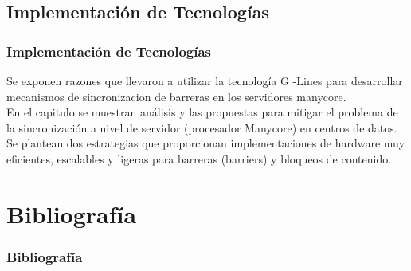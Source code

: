 \documentclass[11pt]{beamer}					%
\begin{document}
		\subsection{Implementación de Tecnologías}	
		 \begin{frame}[fragile]	
		 \frametitle{Implementación de Tecnologías}
		Se exponen razones que llevaron a utilizar la tecnología
G -Lines para desarrollar mecanismos de sincronizacion de
barreras en los servidores manycore.\\
En el capitulo se muestran análisis y las propuestas para mitigar el problema de la sincronización a nivel de servidor (procesador Manycore) en centros de datos. Se plantean dos estrategias que proporcionan implementaciones de hardware muy eficientes, escalables y ligeras para barreras (barriers) y bloqueos de contenido.


		
		
		
		\end{frame}
		
	
\section{Bibliografía}	
	\begin{frame}[fragile]
		\frametitle{Bibliografía} 		
       	\nocite{*}				%
	\end{frame}		
				
\end{document}
